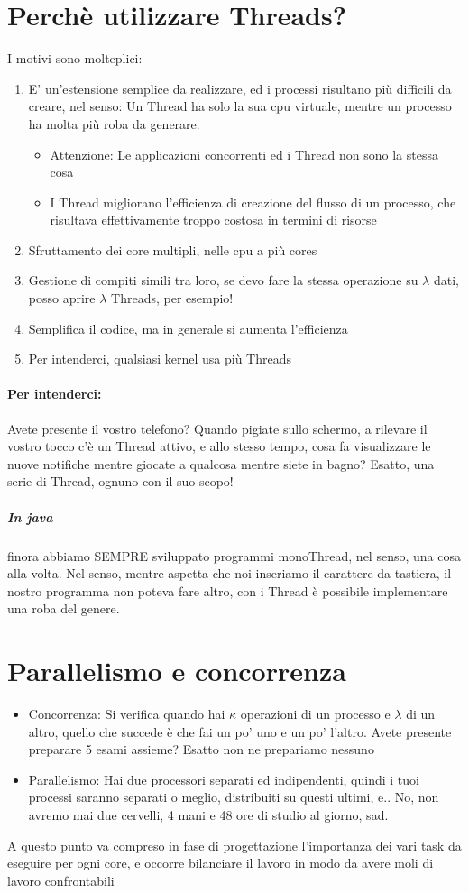 \documentclass[12pt, a4paper, openany, twoside]{book}
\begin{document}
\section{Perchè utilizzare Threads?}
I motivi sono molteplici:
\begin{enumerate}
	\item E' un'estensione semplice da realizzare, ed i processi risultano più
	difficili da creare, nel senso: Un Thread ha solo la sua cpu virtuale, mentre
	un processo ha molta più roba da generare.
	\begin{itemize}
		\item Attenzione: Le applicazioni concorrenti ed i Thread non sono la 
		stessa cosa
		\item I Thread migliorano l'efficienza di creazione del flusso di un
		processo, che risultava effettivamente troppo costosa in termini di
		risorse
	\end{itemize}
	\item Sfruttamento dei core multipli, nelle cpu a più cores
	\item Gestione di compiti simili tra loro, se devo fare la stessa operazione
	su $\lambda$ dati, posso aprire $\lambda$ Threads, per esempio!
	\item Semplifica il codice, ma in generale si aumenta l'efficienza
	\item Per intenderci, qualsiasi kernel usa più Threads
\end{enumerate}
\paragraph{Per intenderci: }Avete presente il vostro telefono? Quando pigiate
sullo schermo, a rilevare il vostro tocco c'è un Thread attivo, e allo stesso
tempo, cosa fa visualizzare le nuove notifiche mentre giocate a qualcosa mentre
siete in bagno? Esatto, una serie di Thread, ognuno con il suo scopo! 
\subparagraph{In java } finora abbiamo SEMPRE sviluppato programmi monoThread,
nel senso, una cosa alla volta. Nel senso, mentre aspetta che noi inseriamo il
carattere da tastiera, il nostro programma non poteva fare altro, con i Thread
è possibile implementare una roba del genere.
\section{Parallelismo e concorrenza}
\begin{itemize}
	\item Concorrenza: Si verifica quando hai $\kappa$ operazioni di un processo
	e $\lambda$ di un altro, quello che succede è che fai un po' uno e un po' 
	l'altro. Avete presente preparare 5 esami assieme? Esatto non ne prepariamo 
	nessuno
	\item Parallelismo: Hai due processori separati ed indipendenti, quindi
	i tuoi processi saranno separati o meglio, distribuiti su questi ultimi, 
	e.. No, non avremo mai due cervelli, 4 mani e 48 ore di studio al giorno, sad.
\end{itemize}
A questo punto va compreso in fase di progettazione l'importanza dei vari task
da eseguire per ogni core, e occorre bilanciare il lavoro in modo da avere
moli di lavoro confrontabili
\end{document}
